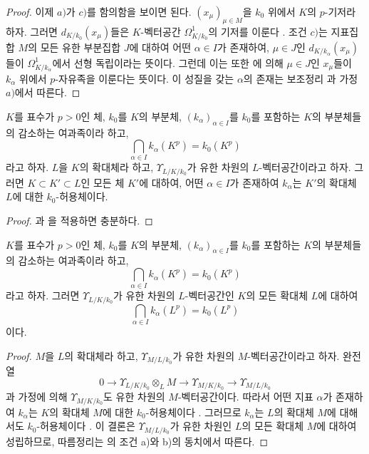 \begin{proof}
이제 $a)$가 $c)$를 함의함을 보이면 된다. $(x_\mu)_{\mu\in M}$을
$k_0$ 위에서 $K$의 $p$-기저라 하자. 그러면
$d_{K/k_0}(x_\mu)$들은 $K$-벡터공간 $\Omega^1_{K/k_0}$의 기저를
이룬다 . 조건 $c)$는 지표집합 $M$의 모든 유한
부분집합 $J$에 대하여 어떤 $\alpha\in I$가 존재하여,
$\mu\in J$인 $d_{K/k_\alpha}(x_\mu)$들이
$\Omega^1_{K/k_\alpha}$에서 선형 독립이라는 뜻이다. 그런데 이는
또한 에 의해 $\mu\in J$인 $x_\mu$들이
$k_\alpha$ 위에서 $p$-자유족을 이룬다는 뜻이다. 이 성질을 갖는
$\alpha$의 존재는 보조정리 과 가정 $a)$에서
따른다.
\end{proof}


\begin{corollary}[21.8.4]
\label{0.21.8.4-ko}
$K$를 표수가 $p>0$인 체, $k_0$를 $K$의 부분체,
$(k_\alpha)_{\alpha\in I}$를 $k_0$를 포함하는 $K$의 부분체들의
감소하는 여과족이라 하고,
\[
\bigcap_{\alpha\in I}k_\alpha(K^p)=k_0(K^p)
\]
라고 하자. $L$을 $K$의 확대체라 하고, $\Upsilon_{L/K/k_0}$가
유한 차원의 $L$-벡터공간이라고 하자. 그러면
$K\subset K'\subset L$인 모든 체 $K'$에 대하여, 어떤
$\alpha\in I$가 존재하여 $k_\alpha$는 $K'$의 확대체 $L$에 대한
$k_0$-허용체이다.
\end{corollary}

\begin{proof}
과 을 적용하면 충분하다.
\end{proof}

\begin{corollary}[21.8.5]
\label{0.21.8.5-ko}
$K$를 표수가 $p>0$인 체, $k_0$를 $K$의 부분체,
$(k_\alpha)_{\alpha\in I}$를 $k_0$를 포함하는 $K$의 부분체들의
감소하는 여과족이라 하고,
\[
\bigcap_{\alpha\in I}k_\alpha(K^p)=k_0(K^p)
\]
라고 하자. 그러면 $\Upsilon_{L/K/k_0}$가 유한 차원의
$L$-벡터공간인 $K$의 모든 확대체 $L$에 대하여
\[
\bigcap_{\alpha\in I}k_\alpha(L^p)=k_0(L^p)
\]
이다.
\end{corollary}

\begin{proof}
$M$을 $L$의 확대체라 하고, $\Upsilon_{M/L/k_0}$가 유한 차원의
$M$-벡터공간이라고 하자. 완전열 
\[
0\longrightarrow\Upsilon_{L/K/k_0}\otimes_LM
\longrightarrow\Upsilon_{M/K/k_0}
\longrightarrow\Upsilon_{M/L/k_0}
\]
과 가정에 의해 $\Upsilon_{M/K/k_0}$도 유한 차원의
$M$-벡터공간이다. 따라서 어떤 지표 $\alpha$가 존재하여
$k_\alpha$는 $K$의 확대체 $M$에 대한 $k_0$-허용체이다
. 그러므로 $k_\alpha$는 $L$의 확대체 $M$에
대해서도 $k_0$-허용체이다 . 이 결론은
$\Upsilon_{M/L/k_0}$가 유한 차원인 $L$의 모든 확대체 $M$에 대하여
성립하므로, 따름정리는 의 조건 a)와 b)의
동치에서 따른다.
\end{proof}

